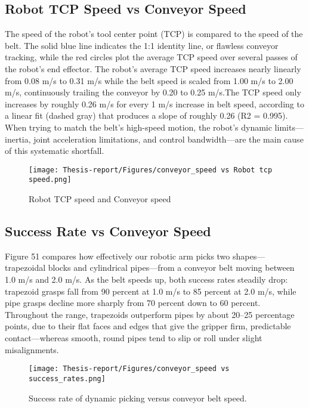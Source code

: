 \documentclass[12pt]{article}
\begin{document}
\subsection{Robot TCP Speed vs Conveyor Speed}
The speed of the robot's tool center point (TCP) is compared to the speed of the belt.
 The solid blue line indicates the 1:1 identity line, or flawless conveyor tracking, while the red circles plot the average TCP speed over several passes of the robot's end effector.  The robot's average TCP speed increases nearly linearly from 0.08 m/s to 0.31 m/s while the belt speed is scaled from 1.00 m/s to 2.00 m/s, continuously trailing the conveyor by 0.20 to 0.25 m/s.The TCP speed only increases by roughly 0.26 m/s for every 1 m/s increase in belt speed, according to a linear fit (dashed gray) that produces a slope of roughly 0.26 (R2 = 0.995).  When trying to match the belt's high-speed motion, the robot's dynamic limits—inertia, joint acceleration limitations, and control bandwidth—are the main cause of this systematic shortfall.
 
\begin{figure}[h]
    \centering
    \texttt{[image: Thesis-report/Figures/conveyor\_speed vs Robot tcp speed.png]}
    \caption{Robot TCP speed and Conveyor speed \cite{ref22}}
    \label{fig1.Photoneo Cmaera}
\end{figure}


\subsection{Success Rate vs Conveyor Speed}
Figure 51 compares how effectively our robotic arm picks two shapes—trapezoidal blocks and cylindrical pipes—from a conveyor belt moving between 1.0 m/s and 2.0 m/s. As the belt speeds up, both success rates steadily drop: trapezoid grasps fall from 90 percent at 1.0 m/s to 85 percent at 2.0 m/s, while pipe grasps decline more sharply from 70 percent down to 60 percent. Throughout the range, trapezoids outperform pipes by about 20–25 percentage points, due to their flat faces and edges that give the gripper firm, predictable contact—whereas smooth, round pipes tend to slip or roll under slight misalignments.
\begin{figure}[h]
    \centering
    \texttt{[image: Thesis-report/Figures/conveyor\_speed vs success\_rates.png]}
    \caption{Success rate of dynamic picking versus conveyor belt speed. \cite{ref22}}
    \label{fig1.Photoneo Cmaera}
\end{figure}
\end{document}
